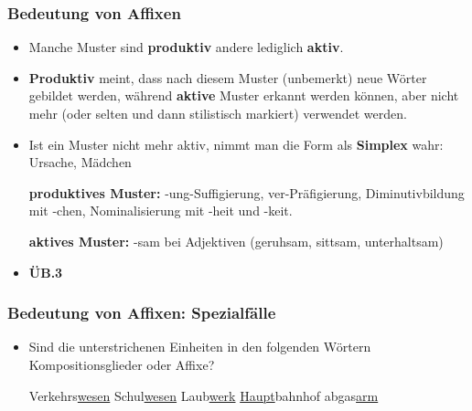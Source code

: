 
\begin{frame}
\frametitle{Bedeutung von Affixen}

\begin{itemize}
	\item Manche Muster sind \textbf{produktiv} andere lediglich \textbf{aktiv}.
	\item \textbf{Produktiv} meint, dass nach diesem Muster (unbemerkt) neue Wörter gebildet werden, während \textbf{aktive} Muster erkannt werden können, aber nicht mehr (oder selten und dann stilistisch markiert) verwendet werden.
	\item Ist ein Muster nicht mehr aktiv, nimmt man die Form als \textbf{Simplex} wahr: Ursache, Mädchen
	
	\ea \textbf{produktives Muster:} -ung-Suffigierung, ver-Präfigierung, Diminutivbildung mit -chen, Nominalisierung mit -heit und -keit.
	\z
	
	\ea  \textbf{aktives Muster:} -sam bei Adjektiven (geruhsam, sittsam,
unterhaltsam)
	\z

	\item \textbf{ÜB.3}
	
\end{itemize}


\end{frame}



\begin{frame}
\frametitle{Bedeutung von Affixen: Spezialfälle}

\begin{itemize}
	\item Sind die unterstrichenen Einheiten in den folgenden Wörtern Kompositionsglieder oder Affixe? 
	
\vspace{1em}
	
	\eal 
	\ex Verkehrs\underline{wesen}
	\ex[]
	\ex Schul\underline{wesen}
	\ex[]
	\ex Laub\underline{werk}
	\ex[]
	\ex \underline{Haupt}bahnhof
	\ex[]
	\ex abgas\underline{arm}
	\zl
	
\end{itemize}

\end{frame}




